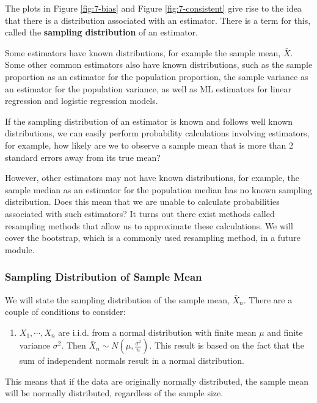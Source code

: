 \documentclass[
]{book}
\providecommand{\tightlist}{%
  \setlength{\itemsep}{0pt}\setlength{\parskip}{0pt}}
\begin{document}
The plots in Figure \ref{fig:7-bias} and Figure \ref{fig:7-consistent} give rise to the idea that there is a distribution associated with an estimator. There is a term for this, called the \textbf{sampling distribution} of an estimator.

Some estimators have known distributions, for example the sample mean, \(\bar{X}\). Some other common estimators also have known distributions, such as the sample proportion as an estimator for the population proportion, the sample variance as an estimator for the population variance, as well as ML estimators for linear regression and logistic regression models.

If the sampling distribution of an estimator is known and follows well known distributions, we can easily perform probability calculations involving estimators, for example, how likely are we to observe a sample mean that is more than 2 standard errors away from its true mean?

However, other estimators may not have known distributions, for example, the sample median as an estimator for the population median has no known sampling distribution. Does this mean that we are unable to calculate probabilities associated with such estimators? It turns out there exist methods called resampling methods that allow us to approximate these calculations. We will cover the bootstrap, which is a commonly used resampling method, in a future module.

\hypertarget{sampdistmean}{%
\subsubsection{Sampling Distribution of Sample Mean}\label{sampdistmean}}

We will state the sampling distribution of the sample mean, \(\bar{X}_n\). There are a couple of conditions to consider:

\begin{enumerate}
\def\labelenumi{\arabic{enumi}.}
\tightlist
\item
  \(X_1, \cdots, X_n\) are i.i.d. from a normal distribution with finite mean \(\mu\) and finite variance \(\sigma^2\). Then \(\bar{X}_n \sim N(\mu, \frac{\sigma^2}{n})\). This result is based on the fact that the sum of independent normals result in a normal distribution.
\end{enumerate}

This means that if the data are originally normally distributed, the sample mean will be normally distributed, regardless of the sample size.
\end{document}
